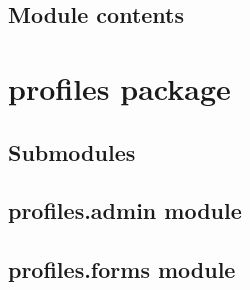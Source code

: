 \documentclass[letterpaper,10pt,english]{sphinxmanual}
\begin{document}

\begin{fulllineitems}
\label{notifications:notifications.views.list_notifications_sanidad}
\end{fulllineitems}


\begin{fulllineitems}
\label{notifications:notifications.views.realizedNotification}
\end{fulllineitems}



\subsection{Module contents}
\label{notifications:module-contents}\label{notifications:module-notifications}

\section{profiles package}
\label{profiles:profiles-package}\label{profiles::doc}

\subsection{Submodules}
\label{profiles:submodules}

\subsection{profiles.admin module}
\label{profiles:profiles-admin-module}\label{profiles:module-profiles.admin}

\subsection{profiles.forms module}
\label{profiles:profiles-forms-module}\label{profiles:module-profiles.forms}
\end{document}
